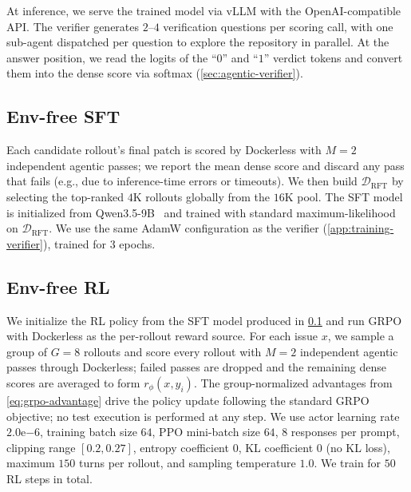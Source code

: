 \documentclass[]{arxiv_template}
\newcommand{\approach}{Dockerless\xspace}
\newcommand{\todo}[1]{\textcolor{red}{[TODO: #1]}}
\newcommand{\zeng}[1]{\textcolor[rgb]{1,0.66,0}{\textbf{[Zeng: #1]}}}
\begin{document}
At inference, we serve the trained model via vLLM with the OpenAI-compatible API.
The verifier generates $2$--$4$ verification questions per scoring call, with one sub-agent dispatched per question to explore the repository in parallel.
At the answer position, we read the logits of the ``$0$'' and ``$1$'' verdict tokens and convert them into the dense score via softmax (\cref{sec:agentic-verifier}).

\subsection{Env-free SFT}
\label{app:training-sft}

Each candidate rollout's final patch is scored by \approach with $M{=}2$ independent agentic passes; we report the mean dense score and discard any pass that fails (e.g., due to inference-time errors or timeouts).
We then build $\mathcal{D}_{\text{RFT}}$ by selecting the top-ranked $4$K rollouts globally from the $16$K pool.
The SFT model is initialized from Qwen3.5-9B~\citep{team2026qwen35} and trained with standard maximum-likelihood on $\mathcal{D}_{\text{RFT}}$.
We use the same AdamW configuration as the verifier (\cref{app:training-verifier}), trained for $3$ epochs.

\subsection{Env-free RL}
\label{app:training-rl}

We initialize the RL policy from the SFT model produced in \cref{app:training-sft} and run GRPO~\citep{shao2024deepseekmath} with \approach as the per-rollout reward source.
For each issue $x$, we sample a group of $G{=}8$ rollouts and score every rollout with $M{=}2$ independent agentic passes through \approach; failed passes are dropped and the remaining dense scores are averaged to form $r_\phi(x, y_i)$.
The group-normalized advantages from \cref{eq:grpo-advantage} drive the policy update following the standard GRPO objective; no test execution is performed at any step.
We use actor learning rate $2.0\mathrm{e}{-6}$, training batch size $64$, PPO mini-batch size $64$, $8$ responses per prompt, clipping range $[0.2, 0.27]$, entropy coefficient $0$, KL coefficient $0$ (no KL loss), maximum $150$ turns per rollout, and sampling temperature $1.0$.
We train for $50$ RL steps in total.
\end{document}
